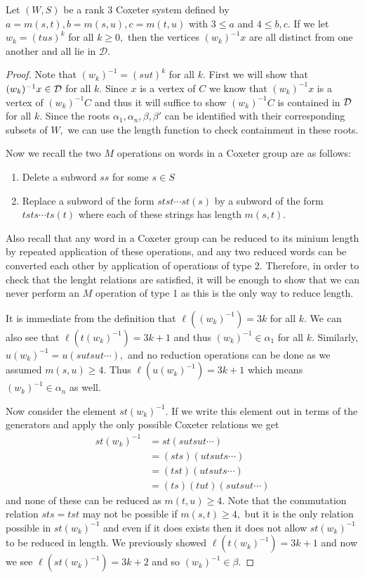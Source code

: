 \documentclass[class=book, crop=false,12 pt]{standalone}
\begin{document}
\begin{lemma}
	\label{lem:infmany}
	Let $(W,S)$ be a rank 3 Coxeter system defined by $a=m(s,t),b=m(s,u),c=m(t,u)$ with $3\le a$ and $4\le b,c.$ If we let $w_k=(tus)^k$ for all $k\ge 0,$ then the vertices $(w_k)^{-1}x$ are all distinct from one another and all lie in $\mathcal{D}.$
\end{lemma}
\begin{proof}
	Note that $(w_k)^{-1}=(sut)^k$ for all $k.$ First we will show that $(w_k)^{-1}x\in \mathcal{D}$ for all $k.$ Since $x$ is a vertex of $C$ we know that $(w_k)^{-1}x$ is a vertex of $(w_k)^{-1}C$ and thus it will suffice to show $(w_k)^{-1}C$ is contained in $\mathcal{D}$ for all $k.$ Since the roots $\alpha_1,\alpha_n,\beta,\beta'$ can be identified with their corresponding subsets of $W,$ we can use the length function to check containment in these roots.

Now we recall the two $M$ operations on words in a Coxeter group are as follows:
\begin{enumerate}
	\item Delete a subword $ss$ for some $s\in S$
	\item Replace a subword of the form $stst\cdots st(s)$ by a subword of the form $tsts\cdots ts(t)$ where each of these strings has length $m(s,t).$
\end{enumerate}
Also recall that any word in a Coxeter group can be reduced to its minium length by repeated application of these operations, and any two reduced words can be converted each other by application of operations of type 2. Therefore, in order to check that the lenght relations are satisfied, it will be enough to show that we can never perform an $M$ operation of type 1 as this is the only way to reduce length.

It is immediate from the definition that $\ell((w_k)^{-1})=3k$ for all $k.$ We can also see that $\ell(t(w_k)^{-1})=3k+1$ and thus $(w_k)^{-1}\in \alpha_1$ for all $k.$ Similarly, $u(w_k)^{-1}=u(sutsut\cdots),$ and no reduction operations can be done as we assumed $m(s,u)\ge 4.$ Thus $\ell(u(w_k)^{-1})=3k+1$ which means $(w_k)^{-1}\in \alpha_n$ as well.

	Now consider the element $st(w_k)^{-1}.$ If we write this element out in terms of the generators and apply the only possible Coxeter relations we get
	\begin{align*}
		st(w_k)^{-1}&=st(sutsut\cdots)\\
		     &=(sts)(utsuts\cdots)\\
		     &=(tst)(utsuts\cdots)\\
		     &=(ts)(tut)(sutsut\cdots)
	\end{align*}
	and none of these can be reduced as $m(t,u)\ge 4.$ Note that the commutation relation $sts=tst$ may not be possible if $m(s,t)\ge 4,$ but it is the only relation possible in $st(w_k)^{-1}$ and even if it does exists then it does not allow $st(w_k)^{-1}$ to be reduced in length. We previously showed $\ell(t(w_k)^{-1})=3k+1$ and now we see $\ell(st(w_k)^{-1})=3k+2$ and so $(w_k)^{-1}\in \beta.$


\end{proof}
\end{document}

